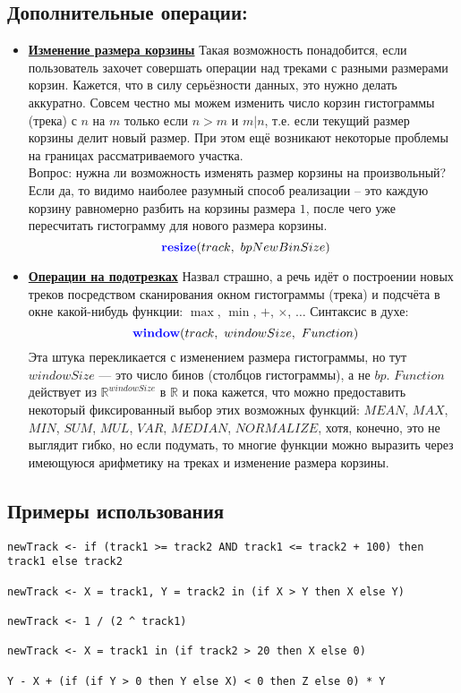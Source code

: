 \subsection*{Дополнительные операции:}
\begin{itemize}
	\item \textbf{\underline{Изменение размера корзины}} Такая возможность понадобится, если пользователь захочет совершать операции над треками с разными размерами корзин. Кажется, что в силу серьёзности данных, это нужно делать аккуратно. Совсем честно мы можем изменить число корзин гистограммы (трека) с $n$ на $m$ только если $n > m$ и $m | n$, т.е. если текущий размер корзины делит новый размер. При этом ещё возникают некоторые проблемы на границах рассматриваемого участка.\\
	Вопрос: нужна ли возможность изменять размер корзины на произвольный? Если да, то видимо наиболее разумный способ реализации -- это каждую корзину равномерно разбить на корзины размера $1$, после чего уже пересчитать гистограмму для нового размера корзины.
	\[
		\kw { resize}(track,\ bpNewBinSize) 
	\]
	\item \textbf{\underline{Операции на подотрезках}} Назвал страшно, а речь идёт о построении новых треков посредством сканирования окном гистограммы (трека) и подсчёта в окне какой-нибудь функции: $\max$, $\min$, $+$, $\times$, $\ldots$ Синтаксис в духе:
	\[
		\kw { window}(track,\ windowSize,\ Function) 
	\]
	Эта штука перекликается с изменением размера гистограммы, но тут $windowSize$ --- это число бинов (столбцов гистограммы), а не $bp$.
	$Function$ действует из $\mathbb{R}^{windowSize}$ в $\mathbb{R}$ и пока кажется, что можно предоставить некоторый фиксированный выбор этих возможных функций: $MEAN$, $MAX$, $MIN$, $SUM$, $MUL$, $VAR$, $MEDIAN$, $NORMALIZE$, хотя, конечно, это не выглядит гибко, но если подумать, то многие функции можно выразить через имеющуюся арифметику на треках и изменение размера корзины.
\end{itemize}

\subsection*{Примеры использования}
\begin{lstlisting}
newTrack <- if (track1 >= track2 AND track1 <= track2 + 100) then track1 else track2

newTrack <- X = track1, Y = track2 in (if X > Y then X else Y)

newTrack <- 1 / (2 ^ track1)

newTrack <- X = track1 in (if track2 > 20 then X else 0)

Y - X + (if (if Y > 0 then Y else X) < 0 then Z else 0) * Y
\end{lstlisting}

